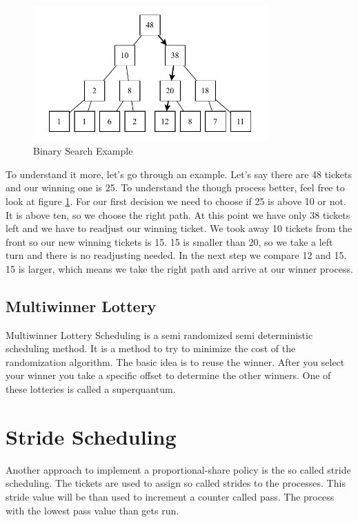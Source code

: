 \begin{figure}[h]
    \centering
    \includegraphics[width=0.8\textwidth]{Assets/Binary-Search.pdf}
    \caption{Binary Search Example}
    \label{fig:binary-search}
\end{figure}

To understand it more, let's go through an example. Let's say there are 48 tickets and our winning one is 25.
To understand the though process better, feel free to look at figure \ref{fig:binary-search}.
For our first decision we need to choose if 25 is above 10 or not.
It is above ten, so we choose the right path.
At this point we have only 38 tickets left and we have to readjust our winning ticket.
We took away 10 tickets from the front so our new winning tickets is 15.
15 is smaller than 20, so we take a left turn and there is no readjusting needed.
In the next step we compare 12 and 15.
15 is larger, which means we take the right path and arrive at our winner process.

\subsection{Multiwinner Lottery}

Multiwinner Lottery Scheduling is a semi randomized semi deterministic scheduling method.
It is a method to try to minimize the cost of the randomization algorithm.
The basic idea is to reuse the winner.
After you select your winner you take a specific offset to determine the other winners.
One of these lotteries is called a superquantum.

\section{Stride Scheduling}

Another approach to implement a proportional-share policy is the so called stride scheduling.
The tickets are used to assign so called strides to the processes.
This stride value will be than used to increment a counter called pass.
The process with the lowest pass value than gets run.

